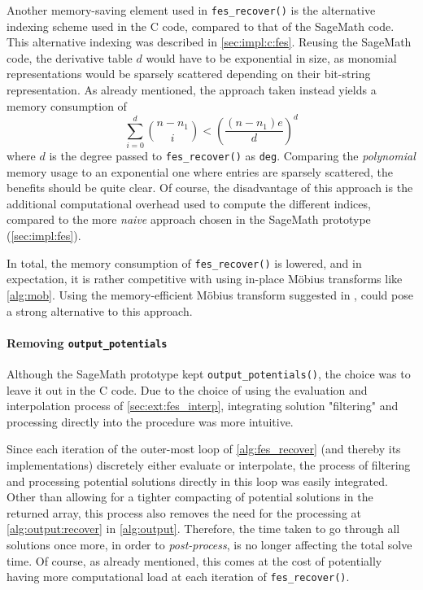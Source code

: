 Another memory-saving element used in \texttt{fes\_recover()} is the alternative indexing scheme used in the C code, compared to that of the SageMath code. This alternative indexing was described in \cref{sec:impl:c:fes}. Reusing the SageMath code, the derivative table $d$ would have to be exponential in size, as monomial representations would be sparsely scattered depending on their bit-string representation. As already mentioned, the approach taken instead yields a memory consumption of 
$$
    \sum_{i = 0 }^{d} \binom{n - n_1}{i} < \left(\frac{(n - n_1)e}{d}\right)^d
$$
where $d$ is the degree passed to \texttt{fes\_recover()} as \texttt{deg}. Comparing the \textit{polynomial} memory usage to an exponential one where entries are sparsely scattered, the benefits should be quite clear. Of course, the disadvantage of this approach is the additional computational overhead used to compute the different indices, compared to the more \textit{naive} approach chosen in the SageMath prototype (\cref{sec:impl:fes}).

In total, the memory consumption of \texttt{fes\_recover()} is lowered, and in expectation, it is rather competitive with using in-place Möbius transforms like \cref{alg:mob}. Using the memory-efficient Möbius transform suggested in \cite{eurocrypt-2021-30841}, could pose a strong alternative to this approach.

\paragraph*{Removing \texttt{output\_potentials}} Although the SageMath prototype kept \texttt{output\_potentials()}, the choice was to leave it out in the C code. Due to the choice of using the evaluation and interpolation process of \cref{sec:ext:fes_interp}, integrating solution "filtering" and processing directly into the procedure was more intuitive.

Since each iteration of the outer-most loop of \cref{alg:fes_recover} (and thereby its implementations) discretely either evaluate or interpolate, the process of filtering and processing potential solutions directly in this loop was easily integrated. Other than allowing for a tighter compacting of potential solutions in the returned array, this process also removes the need for the processing at \cref{alg:output:recover} in \cref{alg:output}. Therefore, the time taken to go through all solutions once more, in order to \textit{post-process}, is no longer affecting the total solve time. Of course, as already mentioned, this comes at the cost of potentially having more computational load at each iteration of \texttt{fes\_recover()}.

